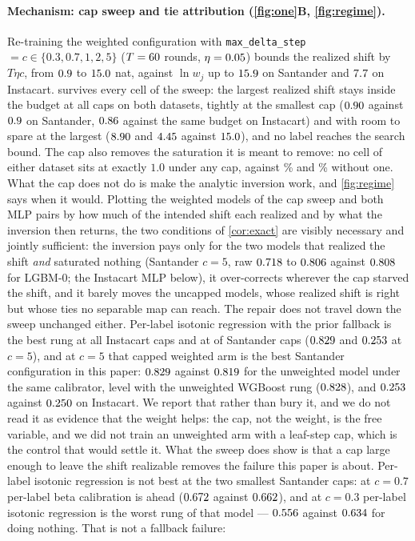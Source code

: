 \documentclass[sigconf,nonacm]{acmart}
\newcommand{\Nm}{\textsf{LGBM-0}\xspace}
\begin{document}
\paragraph{Mechanism: cap sweep and tie attribution (\cref{fig:one}B, \cref{fig:regime}).} Re-training the weighted configuration with \texttt{max\_delta\_step}$=c\in\{0.3,0.7,1,2,5\}$ ($T=60$ rounds, $\eta=0.05$) bounds the realized shift by $T\eta c$, from $0.9$ to $15.0$ nat, against $\ln w_j$ up to $15.9$ on Santander and $7.7$ on Instacart.  survives every cell of the sweep: the largest realized shift stays inside the budget at all \ncapN{} caps on both datasets, tightly at the smallest cap ($0.90$ against $0.9$ on Santander, $0.86$ against the same budget on Instacart) and with room to spare at the largest ($8.90$ and $4.45$ against $15.0$), and no label reaches the search bound. The cap also removes the saturation it is meant to remove: no cell of either dataset sits at exactly $1.0$ under any cap, against \ncapNoneSatOne\% and \nIcapNoneSatOne\% without one. What the cap does not do is make the analytic inversion work, and \cref{fig:regime} says when it would. Plotting the weighted models of the cap sweep and both MLP pairs by how much of the intended shift each realized and by what the inversion then returns, the two conditions of \cref{cor:exact} are visibly necessary and jointly sufficient: the inversion pays only for the two models that realized the shift \emph{and} saturated nothing (Santander $c=5$, raw $0.718$ to $0.806$ against $0.808$ for \Nm; the Instacart MLP below), it over-corrects wherever the cap starved the shift, and it barely moves the uncapped models, whose realized shift is right but whose ties no separable map can reach. The repair does not travel down the sweep unchanged either. Per-label isotonic regression with the prior fallback is the best rung at all \nInCapsIsoBest{} Instacart caps and at \nnCapsIsoBest{} of \nnCapsRungs{} Santander caps ($0.829$ and $0.253$ at $c=5$), and at $c=5$ that capped weighted arm is the best Santander configuration in this paper: $0.829$ against $0.819$ for the unweighted model under the same calibrator, level with the unweighted WGBoost rung ($0.828$), and $0.253$ against $0.250$ on Instacart. We report that rather than bury it, and we do not read it as evidence that the weight helps: the cap, not the weight, is the free variable, and we did not train an unweighted arm with a leaf-step cap, which is the control that would settle it. What the sweep does show is that a cap large enough to leave the shift realizable removes the failure this paper is about. Per-label isotonic regression is not best at the two smallest Santander caps: at $c=0.7$ per-label beta calibration is ahead ($0.672$ against $0.662$), and at $c=0.3$ per-label isotonic regression is the worst rung of that model --- $0.556$ against $0.634$ for doing nothing. That is not a fallback failure: 
\end{document}
